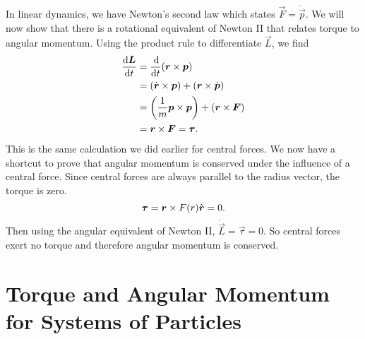 \documentclass[../classical_mechanics.tex]{subfiles}
\begin{document}
        \paragraph{}
        In linear dynamics, we have Newton's second law which states $\vec{F}=\dot{\vec{p}}$.
        We will now show that there is a rotational equivalent of Newton II that relates torque to angular momentum.
        Using the product rule to differentiate $\vec{L}$, we find
        \begin{align}
            \dv{\vec{L}}{t}&=\dv{}{t}(\vec{r}\times\vec{p})\\
            &=(\dot{\vec{r}}\times\vec{p})+(\vec{r}\times\dot{\vec{p}})\\
            &=\left(\frac{1}{m}\vec{p}\times\vec{p}\right)+(\vec{r}\times\vec{F})\\
            &=\vec{r}\times\vec{F}=\vec{\tau}.
        \end{align}
        This is the same calculation we did earlier for central forces.
        We now have a shortcut to prove that angular momentum is conserved under the influence of a central force.
        Since central forces are always parallel to the radius vector, the torque is zero.
        \begin{equation}
            \boldsymbol{\tau}=\boldsymbol{r}\times F(r)\hat{\boldsymbol{r}}=0.
        \end{equation}
        Then using the angular equivalent of Newton II, $\dot{\vec{L}}=\vec{\tau}=0$.
        So central forces exert no torque and therefore angular momentum is conserved.

    \section{Torque and Angular Momentum for Systems of Particles}\label{sec:torque-and-angular-momentum-for-systems-of-particles}
\end{document}
